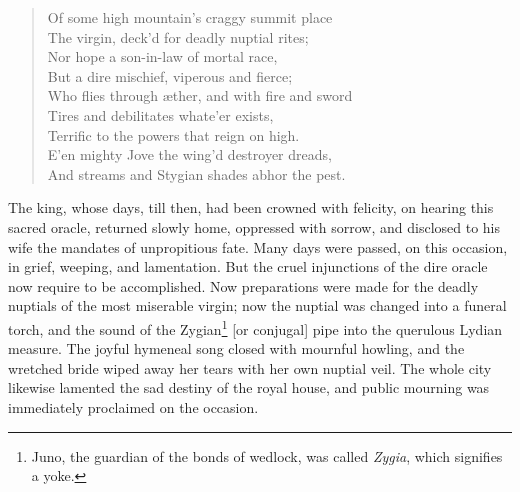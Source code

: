 \documentclass[12pt]{article}
\begin{document}
\begin{verse}
Of some high mountain's craggy summit place\\
The virgin, deck'd for deadly nuptial rites;\\
Nor hope a son-in-law of mortal race,\\
But a dire mischief, viperous and fierce;\\
Who flies through {\ae}ther, and with fire and sword\\
Tires and debilitates whate'er exists,\\
Terrific to the powers that reign on high.\\
E'en mighty Jove the wing'd destroyer dreads,\\
And streams and Stygian shades abhor the pest.
\end{verse}

\noindent The king, whose days, till then, had been crowned with felicity, on
hearing this sacred oracle, returned slowly home, oppressed with sorrow, and
disclosed to his wife the mandates of unpropitious fate. Many days were passed,
on this occasion, in grief, weeping, and lamentation. But the cruel injunctions
of the dire oracle now require to be accomplished. Now preparations were made
for the deadly nuptials of the most miserable virgin; now the nuptial was
changed into a funeral torch, and the sound of the Zygian\footnote{Juno, the
guardian of the bonds of wedlock, was called \textit{Zygia}, which signifies a
yoke.} [or conjugal] pipe into the querulous Lydian measure. The joyful
hymeneal song closed with mournful howling, and the wretched bride wiped away
her tears with her own nuptial veil. The whole city likewise lamented the sad
destiny of the royal house, and public mourning was immediately proclaimed on
the occasion.
\end{document}
